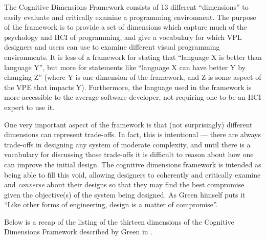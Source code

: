 The Cognitive Dimensions Framework consists of 13 different ``dimensions'' to easily evaluate and critically examine a programming
environment.  The purpose of the framework is to provide a set of 
dimensions which capture much of the psychology and HCI of programming, and give a vocabulary for which VPL
designers and users can use to examine different visual programming environments.  It is less of a framework
for stating that ``language X is better than language Y'', but more for statements like ``language X can have
better Y by changing Z'' (where Y is one dimension of the framework, and Z is some aspect of the VPE that
impacts Y).  Furthermore, the language used in the framework is more accessible to the average software developer, 
not requiring one to be an HCI expert to use it.

One very important aspect of the framework is that (not surprisingly) different dimensions can represent trade-offs.  In fact, 
this is intentional --- there are always trade-offs in designing any system of moderate complexity, and until there is a 
vocabulary for discussing those trade-offs it is difficult to reason about how one can improve the initial design.  The cognitive 
dimensions framework is intended as being able to fill this void, allowing designers to coherently and critically examine 
and \textit{converse} about their designs so that they may find the best compromise given the objective(s) of the system 
being designed.  As Green himself puts it ``Like other forms of engineering, design is a matter of compromise''. \cite{green96}

Below is a recap of the listing of the thirteen dimensions of the Cognitive Dimensions Framework described by Green in \cite{green96}. 

